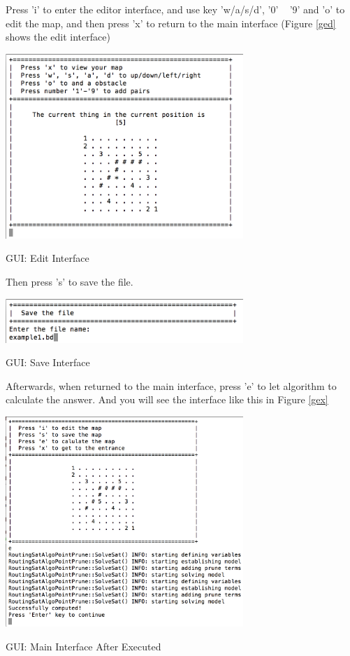 \documentclass[twocolumn]{article}
\begin{document}
Press 'i' to enter the editor interface, and use key 'w/a/s/d', '0' ~ '9' and 'o' to edit the map, and then press 'x' to return to the main interface (Figure \ref{ged} shows the edit interface)

\begin{center}
\makeatletter
\def\@captype{figure}
\makeatother
\includegraphics [width = 9cm]{GUI-edit}
\caption{GUI: Edit Interface}
\label{ged}
\end{center}

Then press 's' to save the file.

\begin{center}
\makeatletter
\def\@captype{figure}
\makeatother
\includegraphics [width = 9cm]{GUI-save}
\caption{GUI: Save Interface}
\label{gs}
\end{center}

Afterwards, when returned to the main interface, press 'e' to let algorithm to calculate the answer. And you will see the interface like this in Figure \ref{gex}

\begin{center}
\makeatletter
\def\@captype{figure}
\makeatother
\includegraphics [width = 9cm]{GUI-execute}
\caption{GUI: Main Interface After Executed}
\label{gex}
\end{center}
\end{document}
